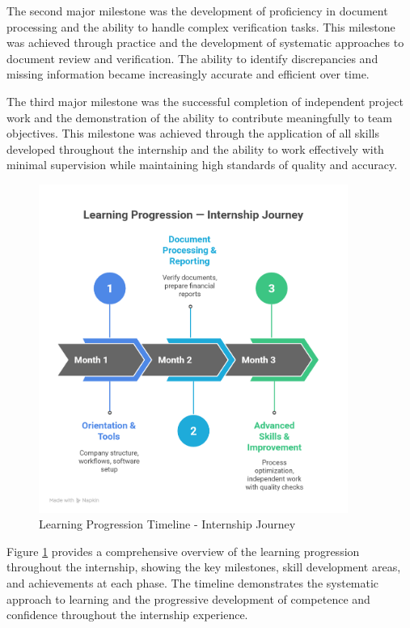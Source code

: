 The second major milestone was the development of proficiency in document processing and the ability to handle complex verification tasks. This milestone was achieved through practice and the development of systematic approaches to document review and verification. The ability to identify discrepancies and missing information became increasingly accurate and efficient over time.

The third major milestone was the successful completion of independent project work and the demonstration of the ability to contribute meaningfully to team objectives. This milestone was achieved through the application of all skills developed throughout the internship and the ability to work effectively with minimal supervision while maintaining high standards of quality and accuracy.

\begin{figure}[H]
    \centering
    \includegraphics[width=0.9\textwidth]{assets/images/learning_timeline_chart.png}
    \caption{Learning Progression Timeline - Internship Journey}
    \label{fig:learning_timeline_chart}
\end{figure}

Figure \ref{fig:learning_timeline_chart} provides a comprehensive overview of the learning progression throughout the internship, showing the key milestones, skill development areas, and achievements at each phase. The timeline demonstrates the systematic approach to learning and the progressive development of competence and confidence throughout the internship experience.

